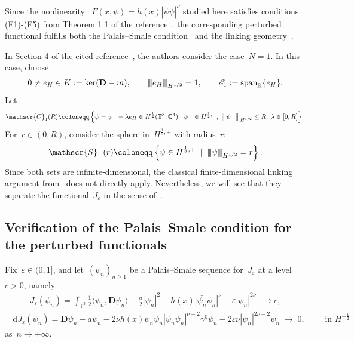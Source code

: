 \documentclass[11pt,final]{amsart}
\newcommand{\tnorm}[1]{%
  \left\vert\kern-0.3ex\left\vert\kern-0.3ex\left\vert #1 \right\vert\kern-0.3ex\right\vert\kern-0.3ex\right\vert
}
\newcommand{\braces}[1]{\left\{#1\right\}} %
\newcommand{\R}{\mathbb{R}}
\newcommand{\C}{\mathbb{C}}
\newcommand{\T}{\mathbb{T}}
\newcommand{\dd}{\mathop{}\!\mathrm{d}}
\newcommand{\eps}{\varepsilon}
\newcommand{\pD}{\mathbf{D}}
\DeclareMathOperator{\dv}{\dd{vol}}
\begin{document}
Since the nonlinearity ~$F(x,\psi)=h(x)|\bar{\psi}\psi|^\nu$ studied here satisfies conditions (F1)-(F5) from Theorem 1.1 of the reference~\cite{WZ2026Stationary}, the corresponding perturbed functional fulfills both the Palais--Smale condition~\cite{WZ2026Stationary} and the linking geometry~\cite[Lemma 4.1]{WZ2026Stationary}.

In Section 4 of the cited reference~\cite{WZ2026Stationary}, the authors consider the case~$N=1$. In this case, choose 
\begin{align}
0\ne e_H\in K:=\ker(\pD-m),\qquad
\tnorm{e_H}_{H^{1/2}}=1,\qquad
\mathscr E_1:=\operatorname{span}_{\R}\{e_H\}.
\end{align}
Let 
\begin{align}
    \mathscr{C}_1(R)
    \coloneqq \braces{\psi= \psi^- + \lambda e_H\in H^{\frac{1}{2}}(\mathbb{T}^3,\C^4) \mid  \psi^-\in H^{\frac{1}{2},-}, \; \tnorm{\psi^-}_{H^{1/2}}\leq R, \; \lambda \in [0,R]}. 
\end{align}
For~$r\in (0,R)$, consider the sphere in~$H^{\frac{1}{2},+}$ with radius~$r$:
\begin{align}
    \mathscr{S}^+(r)\coloneqq \braces{\psi\in H^{\frac{1}{2},+} \; \mid \; \tnorm{\psi}_{H^{{1}/{2}}}=r }.
\end{align}
Since both sets are infinite-dimensional, the classical finite-dimensional linking argument from~\cite{Ambrosetti2007Nonlinear,Benci1979Critical} does not directly apply. Nevertheless, we will see that they separate the functional~$J_\eps$ in the sense of~\cite{Schechter2021linking}. 





\subsection{Verification of the Palais--Smale condition for the perturbed functionals}
Fix~$\eps \in (0,1]$, and let~$(\psi_n)_{n\geq 1}$ be a Palais--Smale sequence for~$J_\eps$ at a level~$c>0$, namely
\begin{align}\label{eq:PS-level}
    J_\eps(\psi_n)=\int_{\T^3} \frac{1}{2}\langle \psi_n, \pD\psi_n\rangle - \frac{a}{2}|\psi_n|^2 - h(x)|\bar{\psi_n}\psi_n|^\nu - \eps|\psi_n|^{2\nu} \dv \to c,
\end{align}
\begin{align}\label{eq:PS:differential}
    \dd J_\eps(\psi_n)= \pD\psi_n - a\psi_n - 2\nu h(x)\bar{\psi_n}\psi_n|\bar{\psi_n}\psi_n|^{\nu-2}\gamma^0\psi_n -2\eps\nu|\psi_n|^{2\nu-2}\psi_n \; \to \; 0
    , \qquad \mbox{ in } H^{-\frac{1}{2}}
\end{align}
as~$n\to +\infty$.
\end{document}
